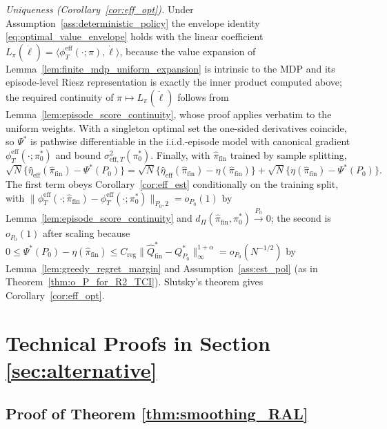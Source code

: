 \documentclass[12pt]{article}
\theoremstyle{remark}\newtheorem{remark}[theorem]{Remark}\theoremstyle{plain}
\begin{document}
\emph{Uniqueness (Corollary~\ref{cor:eff_opt}).}
Under Assumption~\ref{ass:deterministic_policy} the envelope identity
\eqref{eq:optimal_value_envelope} holds with the linear coefficient
$L_\pi(\dot\ell)=\langle\phi^{\mathrm{eff}}_T(\cdot;\pi),\dot\ell\rangle$,
because the value expansion of
Lemma~\ref{lem:finite_mdp_uniform_expansion} is intrinsic to the MDP and
its episode-level Riesz representation is exactly the inner product
computed above; the required continuity of $\pi\mapsto
L_\pi(\dot\ell)$ follows from
Lemma~\ref{lem:episode_score_continuity}, whose proof applies verbatim
to the uniform weights.  With a singleton optimal set the one-sided
derivatives coincide, so $\Psi^*$ is pathwise differentiable in the
i.i.d.-episode model with canonical gradient
$\phi^{\mathrm{eff}}_T(\cdot;\pi^*_0)$ and bound
$\sigma^2_{\mathrm{eff},T}(\pi^*_0)$.  Finally, with
$\widehat\pi_{\mathrm{fin}}$ trained by sample splitting,
\[
    \sqrt N\{\widehat\eta_{\mathrm{eff}}(\widehat\pi_{\mathrm{fin}})
    -\Psi^*(P_0)\}
    =\sqrt N\{\widehat\eta_{\mathrm{eff}}(\widehat\pi_{\mathrm{fin}})
    -\eta(\widehat\pi_{\mathrm{fin}})\}
    +\sqrt N\{\eta(\widehat\pi_{\mathrm{fin}})-\Psi^*(P_0)\}.
\]
The first term obeys Corollary~\ref{cor:eff_est} conditionally on the
training split, with
$\|\phi^{\mathrm{eff}}_T(\cdot;\widehat\pi_{\mathrm{fin}})
-\phi^{\mathrm{eff}}_T(\cdot;\pi^*_0)\|_{P_0,2}=o_{P_0}(1)$ by
Lemma~\ref{lem:episode_score_continuity} and
$d_\Pi(\widehat\pi_{\mathrm{fin}},\pi^*_0)\overset{P_0}{\to}0$; the second is
$o_{P_0}(1)$ after scaling because
$0\le\Psi^*(P_0)-\eta(\widehat\pi_{\mathrm{fin}})
\le C_{\mathrm{reg}}\|\widehat Q^*_{\mathrm{fin}}-Q^*_{P_0}\|_\infty
^{1+\alpha}=o_{P_0}(N^{-1/2})$ by
Lemma~\ref{lem:greedy_regret_margin} and
Assumption~\ref{ass:est_pol} (as in Theorem~\ref{thm:o_P_for_R2_TCI}).
Slutsky's theorem gives Corollary~\ref{cor:eff_opt}.

\section{Technical Proofs in Section \ref{sec:alternative}}

\subsection{Proof of Theorem \ref{thm:smoothing_RAL}}\label{sec:smoothing_proofs}
\end{document}
